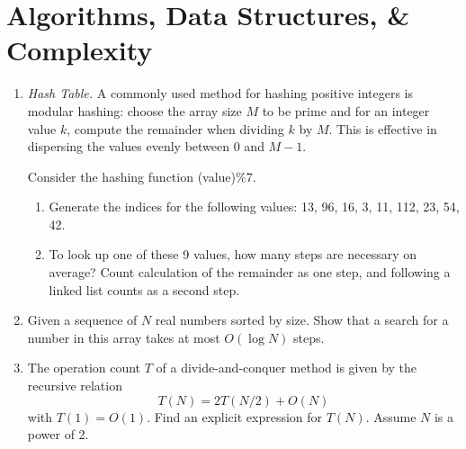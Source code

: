 \documentclass{article}
\begin{document}
\section{Algorithms, Data Structures, \& Complexity}
\begin{enumerate}

\item {\it Hash Table.}  \label{prbl:hash}
A commonly used method for hashing positive integers is modular hashing: choose the array size $M$ to be prime and for an integer value $k$, compute the remainder when dividing $k$ by $M$. This is effective in dispersing the values evenly between 0 and $M-1$. 

Consider the hashing function (value)\%7. 
\vspace{-1em}
\begin{enumerate}\setlength{\itemsep}{0pt}
\item Generate the indices for the following values: 13, 96, 16, 3, 11, 112, 23, 54, 42.
\item To look up one of these 9 values, how many steps are necessary on average?  Count calculation of the remainder as one step, and following a linked list counts as a second step.
\end{enumerate}


\item \label{prbl:bisearch}
  Given a sequence of $N$ real numbers sorted by size. Show that a search for a number in this array takes at most $O(\log N)$ steps.

\item
The operation count $T$ of a divide-and-conquer method is given by the recursive relation
\[
T(N) = 2 T(N/2) + O(N)
\]
with $T(1)=O(1)$. Find an explicit expression for $T(N)$.
Assume $N$ is a power of 2.


\end{enumerate}





\newpage
\end{document}
